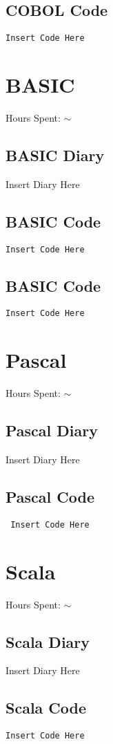 \documentclass{report}
\begin{document}
\subsection*{COBOL Code}
\begin{lstlisting}
Insert Code Here
\end{lstlisting}


\section*{BASIC}
Hours Spent: $\sim$
\subsection*{BASIC Diary}
Insert Diary Here

\subsection*{BASIC Code}
\begin{lstlisting}
Insert Code Here
\end{lstlisting}


\subsection*{BASIC Code}
\begin{lstlisting}
Insert Code Here
\end{lstlisting}


\section*{Pascal}
Hours Spent: $\sim$
\subsection{Pascal Diary}
Insert Diary Here

\subsection*{Pascal Code}
\begin{lstlisting}
 Insert Code Here
\end{lstlisting}

\section*{Scala}
Hours Spent: $\sim$
\subsection*{Scala Diary}
Insert Diary Here

\subsection*{Scala Code}
\begin{lstlisting}
Insert Code Here
\end{lstlisting}
\end{document}
